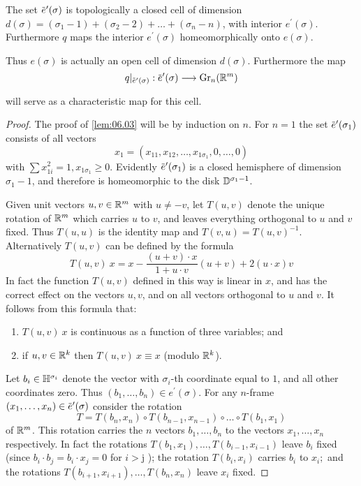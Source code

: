 \documentclass[../main]{subfiles}
\begin{document}
\begin{lemma}
\label{lem:06.03}
The set $\xoverline{e}^{\prime}(\sigma)$ is topologically a closed cell of dimension\newline $d(\sigma)=(\sigma_{1}-1)+(\sigma_{2}-2)+\dots+(\sigma_{n}-n)$, with interior $e^{\prime}(\sigma)$. Furthermore $q$ maps the interior $e^{\prime}(\sigma)$ homeomorphically onto $e(\sigma)$.
\end{lemma}
Thus $e(\sigma)$ is actually an open cell of dimension $d(\sigma)$. Furthermore the map
\[
q |_{\xoverline{e}^{\prime}(\sigma)}:{\xoverline{e}^{\prime}(\sigma)} \varrightarrow{} {\grassmannian_{n}(\bR^m)}
\]
will serve as a characteristic map for this cell.
\begin{proof}
The proof of \ref{lem:06.03} will be by induction on $n$. For $n=1$ the set $\xoverline{e}^{\prime}(\sigma_{1})$ consists of all vectors
\[
x_{1}=(x_{11}, x_{12},\dots, x_{1 \sigma_{1}}, 0,\dots, 0)
\]
with $\sum x_{1 i}^{2}=1, x_{1 \sigma_{1}} \geq 0 $. Evidently $\xoverline{e}^{\prime}(\sigma_{1})$ is a closed hemisphere of dimension $\sigma_{1}-1$, and therefore is homeomorphic to the disk $\mathbb{D}^{\sigma_{1}-1}$.

Given unit vectors $u, v \in \mathbb R^{m}$ with $u \neq-v$, let $T(u, v)$ denote the unique rotation of $\mathbb R^m$ which carries $u$ to $v$, and leaves everything orthogonal to $u$ and $v$ fixed. Thus $T(u, u)$ is the identity map and $T(v, u)=T(u, v)^{-1} .$ Alternatively $T(u, v)$ can be defined by the formula
\[
T(u, v)\: x = x-\frac{(u+v) \cdot x}{1+u \cdot v}(u+v)+2(u \cdot x) v
\]
In fact the function $T(u, v)$ defined in this way is linear in $x$, and has the correct effect on the vectors $u, v$, and on all vectors orthogonal to $u$ and $v$. It follows from this formula that:
\begin{enumerate}[label=\arabic*)]
	\item $T(u, v) \: x$ is continuous as a function of three variables; and
	
	\item if $u, v \in \mathbb R^{k}$ then $T(u, v) \: x \equiv x$ (modulo $\mathbb R^{k}$).
\end{enumerate}

Let $b_{i} \in \mathbb{H}^{\sigma_{i}}$ denote the vector with $\sigma_{i}$-th coordinate equal to $1$, and all other coordinates zero. Thus $(b_{1},\dots, b_{n}) \in e^{\prime}(\sigma) $. For any $n$-frame $(x_{1},\dots, x_{n}) \in \xoverline{e}^{\prime}(\sigma)$ consider the rotation
\[
T=T(b_{n}, x_{n}) \circ T(b_{n-1}, x_{n-1}) \circ\dots \circ T(b_{1}, x_{1})
\]
of $\mathbb R^m$. This rotation carries the $n$ vectors $b_{1},\dots, b_{n}$ to the vectors $x_{1},\dots, x_{n}$ respectively. In fact the rotations $T(b_{1}, x_{1}),\dots, T(b_{i-1}, x_{i-1})$ leave $b_{i}$ fixed (since $b_{i} \cdot b_{j}=b_{i} \cdot x_{j}=0$ for $i>\mathrm{j}$ ); the rotation $T(b_{i}, x_{i})$ carries $b_{i}$ to $x_{i} ;$ and the rotations $T(b_{i+1}, x_{i+1}),\dots, T(b_{n}, x_{n})$ leave $x_{i}$ fixed.


\end{proof}
\end{document}
